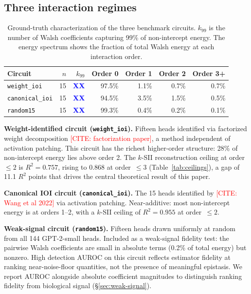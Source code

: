 \documentclass[11pt]{article}
\newcommand{\citeneeded}[1]{\textcolor{red}{[CITE: #1]}}
\newcommand{\numplaceholder}[1]{\textcolor{blue}{\textbf{#1}}}
\begin{document}
\subsection{Three interaction regimes}

\begin{table}[t]
\centering
\caption{Ground-truth characterization of the three benchmark circuits.
$k_{99}$ is the number of Walsh coefficients capturing 99\% of
non-intercept energy. The energy spectrum shows the fraction of total
Walsh energy at each interaction order.}
\label{tab:circuits}
\begin{tabular}{lrrrrrr}
\toprule
Circuit & $n$ & $k_{99}$ & Order 0 & Order 1 & Order 2 & Order 3+ \\
\midrule
\texttt{weight\_ioi} & 15 & \numplaceholder{XX} & 97.5\% & 1.1\% & 0.7\% & 0.7\% \\
\texttt{canonical\_ioi} & 15 & \numplaceholder{XX} & 94.5\% & 3.5\% & 1.5\% & 0.5\% \\
\texttt{random15} & 15 & \numplaceholder{XX} & 99.3\% & 0.4\% & 0.2\% & 0.1\% \\
\bottomrule
\end{tabular}
\end{table}

\textbf{Weight-identified circuit (\texttt{weight\_ioi}).}
Fifteen heads identified via factorized weight decomposition
\citeneeded{factorization paper}, a method independent of activation
patching. This circuit has the richest higher-order structure: 28\% of
non-intercept energy lies above order 2. The $k$-SII reconstruction
ceiling at order~$\leq 2$ is $R^2 = 0.757$, rising to $0.868$ at
order~$\leq 3$ (Table~\ref{tab:ceilings}), a gap of 11.1 $R^2$
points that drives the central theoretical result of this paper.

\textbf{Canonical IOI circuit (\texttt{canonical\_ioi}).}
The 15 heads identified by \citeneeded{Wang et al 2022} via
activation patching. Near-additive: most non-intercept energy is at
orders 1--2, with a $k$-SII ceiling of $R^2 = 0.955$ at
order~$\leq 2$.

\textbf{Weak-signal circuit (\texttt{random15}).}
Fifteen heads drawn uniformly at random from all 144 GPT-2-small
heads. Included as a weak-signal fidelity test: the pairwise Walsh
coefficients are small in absolute terms (0.2\% of total energy) but
nonzero. High detection AUROC on this circuit reflects estimator
fidelity at ranking near-noise-floor quantities, not the presence of
meaningful epistasis. We report AUROC alongside absolute coefficient
magnitudes to distinguish ranking fidelity from biological signal
(\S\ref{sec:weak-signal}).
\end{document}
